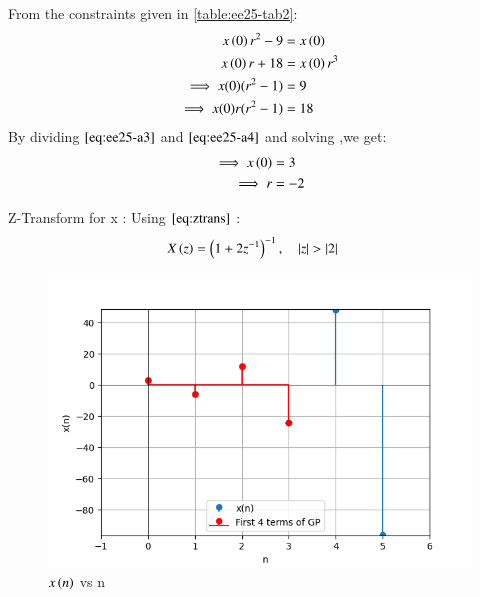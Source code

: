 \documentclass[journal,12pt,onecolumn]{IEEEtran}
\theoremstyle{remark}
\begin{document}
    
\begin{enumerate}
From the constraints given in \ref{table:ee25-tab2}:
   \begin{align}
x\left(0\right)r^2 - 9 &= x\left(0\right) \label{eq:ee25-a1}\\
x\left(0\right)r + 18 &= x\left(0\right)r^3 \label{eq:ee25-a2}\\
\implies x(0)(r^2-1) &= 9 \label{eq:ee25-a3}\\
\implies x (0)r(r^2-1) &=18
\label{eq:ee25-a4}
\end{align}
By dividing $\eqref{eq:ee25-a3}$ and $\eqref{eq:ee25-a4}$ and solving ,we get: 
\begin{align}
    \implies
    x\left(0\right) &= 3\\
    \implies
    r &= -2
\end{align}

 Z-Transform for x :
    Using $\eqref{eq:ztrans}$ :
    \begin{align}
    X\left(z\right) &= \left(1+2z^{-1}\right)^{-1} ,\quad \left\vert z\right\vert>\left\vert2\right\vert 
    \end{align}
    
\end{enumerate}
    \begin{figure}[!ht]    
    \centering
\graphicspath{ {figs/} }
\includegraphics[width=\columnwidth]{graph_1}
\caption{ $x\left(n\right)$ vs n }
\label{graph:ee25-ag2}
\end{figure}







 
\end{document}

